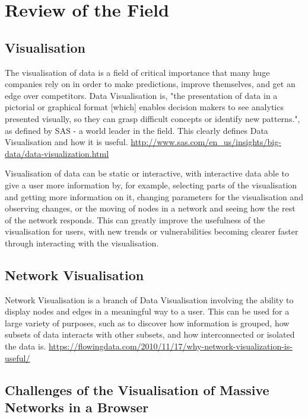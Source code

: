 \documentclass[../dissertation.tex]{subfiles}
\begin{document}
\chapter{Review of the Field}

\section{Visualisation}

The visualisation of data is a field of critical importance that many huge companies rely on in order to make predictions, improve themselves, and get an edge over competitors. Data Visualisation is, "the presentation of data in a pictorial or graphical format [which] enables decision makers to see analytics presented visually, so they can grasp difficult concepts or identify new patterns.", as defined by SAS - a world leader in the field. This clearly defines Data Visualisation and how it is useful. 
\url{http://www.sas.com/en_us/insights/big-data/data-visualization.html}

Visualisation of data can be static or interactive, with interactive data able to give a user more information by, for example, selecting parts of the visualisation and getting more information on it, changing parameters for the visualisation and observing changes, or the moving of nodes in a network and seeing how the rest of the network responds. This can greatly improve the usefulness of the visualisation for users, with new trends or vulnerabilities becoming clearer faster through interacting with the visualisation. 

\section{Network Visualisation}

Network Visualisation is a branch of Data Visualisation involving the ability to display nodes and edges in a meaningful way to a user. This can be used for a large variety of purposes, such as to discover how information is grouped, how subsets of data interacts with other subsets, and how interconnected or isolated the data is.
\url{https://flowingdata.com/2010/11/17/why-network-visualization-is-useful/}

\section{Challenges of the Visualisation of Massive Networks in a Browser}
\end{document}
